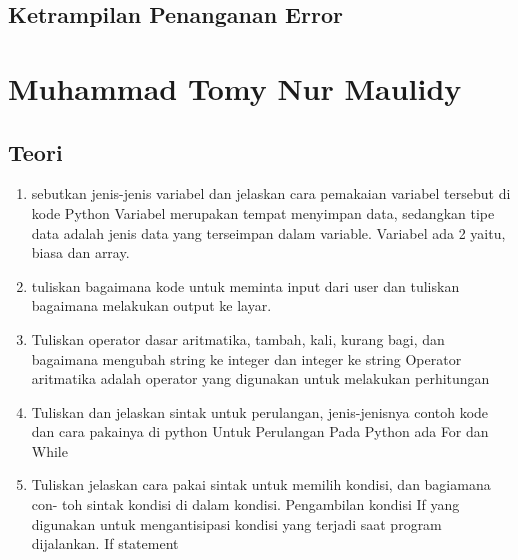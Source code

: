 \subsection{Ketrampilan Penanganan Error}
    



\section{Muhammad Tomy Nur Maulidy}
\subsection{Teori}
\begin{enumerate}
    \item sebutkan jenis-jenis variabel dan jelaskan cara pemakaian variabel tersebut di
    kode Python
    Variabel merupakan tempat menyimpan data, sedangkan tipe data adalah jenis data yang terseimpan dalam variable. Variabel ada 2 yaitu, biasa dan array. 
    

    \item tuliskan bagaimana kode untuk meminta input dari user dan tuliskan bagaimana
    melakukan output ke layar.
    

    \item Tuliskan operator dasar aritmatika, tambah, kali, kurang bagi, dan bagaimana
    mengubah string ke integer dan integer ke string
    Operator  aritmatika adalah operator yang digunakan untuk melakukan perhitungan
    

    \item Tuliskan dan jelaskan sintak untuk perulangan, jenis-jenisnya contoh kode dan
    cara pakainya di python
    Untuk Perulangan Pada Python ada For dan While
    

    \item Tuliskan jelaskan cara pakai sintak untuk memilih kondisi, dan bagiamana con-
    toh sintak kondisi di dalam kondisi.
    Pengambilan kondisi If yang digunakan untuk mengantisipasi kondisi yang terjadi saat program dijalankan.
    If statement
    
    

\end{enumerate}
